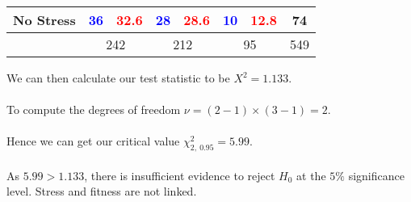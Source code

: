 \documentclass{report}
\begin{document}
{\begin{center}
\begin{tabular}{l | c c c c c c | c}
		No Stress & \textcolor{blue}{36}             & \textcolor{red}{32.6}               & \textcolor{blue}{28}             & \textcolor{red}{28.6}  & \textcolor{blue}{10} & \textcolor{red}{12.8} & 74  \\
		\hline
		          & \multicolumn{2}{c}{242}          & \multicolumn{2}{c}{212}             & \multicolumn{2}{c}{95}           & 549                                                                         \\
	\end{tabular}
\end{center}
We can then calculate our test statistic to be $X^2 = 1.133$.
\\
\\ To compute the degrees of freedom $\nu = (2 - 1) \times (3 - 1) = 2$.
\\
\\ Hence we can get our critical value $\chi^2_{2, \ 0.95} = 5.99$.
\\
\\ As $5.99 > 1.133$, there is insufficient evidence to reject $H_0$ at the $5\%$ significance level. Stress and fitness are not linked.
}
\end{document}
